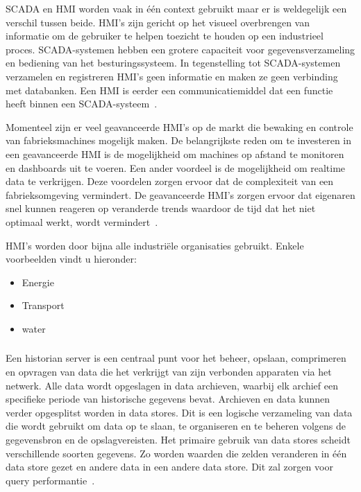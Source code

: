 SCADA en HMI worden vaak in één context gebruikt maar er is weldegelijk een verschil tussen beide. HMI's zijn gericht op het visueel overbrengen van informatie om de gebruiker te helpen toezicht te houden op een industrieel proces. SCADA-systemen hebben een grotere capaciteit voor gegevensverzameling en bediening van het besturingssysteem. In tegenstelling tot SCADA-systemen  verzamelen en registreren HMI's geen informatie en maken ze geen verbinding met databanken. Een HMI is eerder een communicatiemiddel dat een functie heeft binnen een SCADA-systeem~\autocite{2018}.

Momenteel zijn er veel geavanceerde HMI's op de markt die bewaking en controle van fabrieksmachines mogelijk maken. De belangrijkste reden om te investeren in een geavanceerde HMI is de mogelijkheid om machines op afstand te monitoren en dashboards uit te voeren. Een ander voordeel is de mogelijkheid om realtime data te verkrijgen. Deze voordelen zorgen ervoor dat de complexiteit van een fabrieksomgeving vermindert. De geavanceerde HMI's zorgen ervoor dat eigenaren snel kunnen reageren op veranderde trends waardoor de tijd dat het niet optimaal werkt, wordt vermindert~\autocite{Exor2019}. 

HMI's worden door bijna alle industriële organisaties gebruikt. Enkele voorbeelden vindt u hieronder:~\autocite{2018}
\begin{itemize}
    \item Energie
    \item Transport
    \item water
\end{itemize}

\subsubsection{}
\label{subsubsec:Historian}
Een historian server is een centraal punt voor het beheer, opslaan, comprimeren en opvragen van data die het verkrijgt van zijn verbonden apparaten via het netwerk. Alle data wordt opgeslagen in data archieven, waarbij elk archief een specifieke periode van historische gegevens bevat. Archieven en data kunnen verder opgesplitst worden in data stores. Dit is een logische verzameling van data die wordt gebruikt om data op te slaan, te organiseren en te beheren volgens de gegevensbron en de opslagvereisten. Het primaire gebruik van data stores scheidt verschillende soorten gegevens. Zo worden waarden die zelden veranderen in één data store gezet en andere data in een andere data store. Dit zal zorgen voor query performantie~\autocite{Solutions}.

